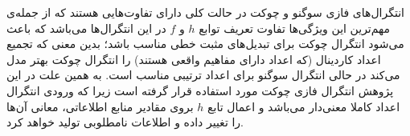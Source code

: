 انتگرال‌های فازی سوگنو و چوکت در حالت کلی دارای تفاوت‌هایی هستند که از جمله‌ی مهم‌ترین این ویژگی‌ها تفاوت تعریف توابع $h$ و $f$ در این انتگرال‌ها می‌باشد که باعث می‌شود انتگرال چوکت برای تبدیل‌های مثبت خطی مناسب باشد؛ بدین معنی که تجمیع اعداد کاردینال (که اعداد دارای مفاهیم واقعی هستند) را انتگرال چوکت بهتر مدل می‌کند در حالی انتگرال سوگنو برای اعداد ترتیبی مناسب است. به همین علت در این پژوهش انتگرال فازی چوکت مورد استفاده قرار گرفته است زیرا که ورودی انتگرال اعداد کاملا معنی‌دار می‌باشد و اعمال تابع $h$ بروی مقادیر منابع اطلاعاتی، معانی آن‌ها را تغییر داده و اطلاعات نامطلوبی تولید خواهد کرد.